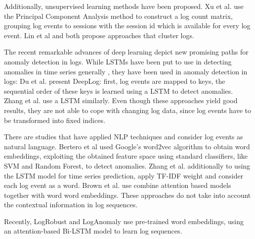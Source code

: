 Additionally, unsupervised learning methods have been proposed. Xu et al. \cite{xu2009detecting} use the Principal Component Analysis method to construct a log count matrix, grouping log events to sessions with the session id which is available for every log event. Lin et al \cite{lin2016log} and \cite{vaarandi2003data} both propose approaches that cluster logs.

The recent remarkable advances of deep learning depict new promising paths for anomaly detection in logs. While LSTMs have been put to use in detecting anomalies in time series generally \cite{malhotra2015long}, they have been used in anomaly detection in logs: Du et al. \cite{du2017deeplog} present DeepLog: first, log events are mapped to keys, the sequential order of these keys is learned using a LSTM to detect anomalies. Zhang et al. \cite{zhang2016automated} use a LSTM similarly. Even though these approaches yield good results, they are not able to cope with changing log data, since log events have to be transformed into fixed indices.

There are studies that have applied NLP techniques and consider log events as natural language. Bertero et al \cite{bertero2017experience} used Google's word2vec algorithm to obtain word embeddings, exploiting the obtained feature space using standard classifiers, like SVM and Random Forest, to detect anomalies. Zhang et al. \cite{zhang2016automated} additionally to using the LSTM model for time series prediction, apply  TF-IDF weight and consider each log event as a word. Brown et al. \cite{brown2018recurrent} use combine attention based models together with word word embeddings. These approaches do not take into account the contextual information in log sequences.

Recently, LogRobust and LogAnomaly use pre-trained word embeddings, using an attention-based Bi-LSTM model to learn log sequences.